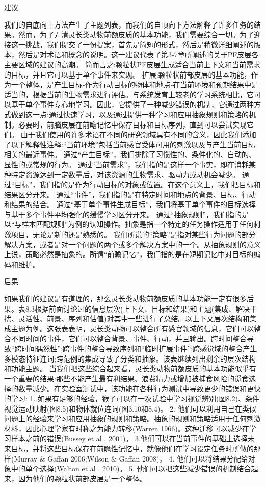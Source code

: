 建议

我们的自底向上方法产生了主题列表，而我们的自顶向下方法解释了许多任务的结果。然而，为了弄清灵长类动物前额皮质的基本功能，我们需要综合一切。为了迎接这一挑战，我们提交了一份提案，首先是简短的形式，然后是稍微详细阐述的版本，然后是对术语和概念的说明。这一建议代表了第3-7章所阐述的关于PF皮层各主要区域的建议的高潮。
简而言之:颗粒状PF皮层生成适合当前上下文和当前需求的目标，并且它可以基于单个事件来实现。
扩展:颗粒状前部皮层的基本功能，作为一个整体，是产生目标-作为行动目标的物体和地点-在当前环境和预期结果中是适当的，根据当前的生物需求进行评估。与系统发育上较老的学习系统相比，它可以基于单个事件专心地学习。因此，它提供了一种减少错误的机制，它通过两种方式做到这一点:通过快速学习，以及通过提供一种学习和应用抽象规则和策略的机制。必要时，前脑皮层在前瞻记忆中保存目标和目标序列，直到可以尝试实现它们。
由于我们使用的许多术语在不同的研究领域具有不同的含义，因此我们添加了以下解释性注释:“当前环境”包括当前感官受体可用的刺激以及与产生当前目标相关的最近事件。
通过“产生目标”，我们排除了习惯性的、条件化的、自动的、显性的或常规的行为。
通过“当前需求”，我们指的是这样一个事实，即在消耗某种特定资源达到一定数量后，对该资源的生物需求、驱动力或动机会减少。
通过“目标”，我们指的是作为行动目标的对象或位置。在这个意义上，我们把目标和结果区分开来。
通过“事件”，我们指的是在特定时间和地点的背景、目标、行动和结果的结合。
通过“基于单个事件生成目标”，我们将基于单个事件的目标选择与基于多个事件平均强化的缓慢学习区分开来。
通过“抽象规则”，我们指的是以“与样本匹配规则”为例的认知操作。抽象是指一个特定的任务操作适用于任何刺激项目，无论是新的还是熟悉的。
我们所说的“策略”是指对某些行为问题的部分解决方案，或者是对一个问题的两个或多个解决方案中的一个。从抽象规则的意义上说，策略必然是抽象的。所谓“前瞻记忆”，我们指的是在短期记忆中对目标的编码和维护。

后果

如果我们的建议是有道理的，那么灵长类动物前额皮质的基本功能一定有很多后果。表8.3根据前面讨论过的信息层次(上下文、目标和结果)和主题(集成、解决干扰、灵活性、前景、序列和估值)对其中一些进行了总结。以上下文层次结构和集成主题为例。这张表表明，灵长类动物可以整合所有感官领域的信息，它们可以整合不同时间的事件，它们可以整合背景、事件、行动，并且输出。跨时间整合导致“跨时间偶然性”;跨事件的整合导致序列和“临时扩展事件”;跨感觉域的整合产生多模态特征连词;跨范例的集成导致了分类和抽象。该表继续列出剩余的层次结构和功能主题。
当我们把这些综合起来看，灵长类动物前额皮质的基本功能似乎有一个重要的结果:那些不能产生最有利结果、浪费精力或增加被捕食风险的觅食选择的数量减少。在实验室测试中，该功能在各种行为测试中导致更少的错误和更快的学习:
1. 如果有足够的经验，猴子可以在一次试验中学习视觉辨别(图8.2)、条件视觉运动映射(图8.5)和物体就位连词(图3.10和8.4)。
2. 他们可以利用自己在类似问题上的经验来学习和应用抽象的规则和策略。抽象的规则和策略适用于任何刺激材料，因此心理学家有时称之为能力转移(Warren 1966)。这种迁移可以减少在学习样本之前的错误(Bussey et al . 2001)。
3.他们可以在当前事件的基础上选择未来目标，并将这些目标保存在前瞻性记忆中，就像他们在学习设定任务时所做的那样(Murray \& Gaffan 2006;Wilson \& Gaffan 2008)。
4. 他们可以将结果分配给对象中的单个选择(Walton et al . 2010)。
5. 他们可以把这些减少错误的机制结合起来，因为他们的颗粒状前部皮层是一个整体。

